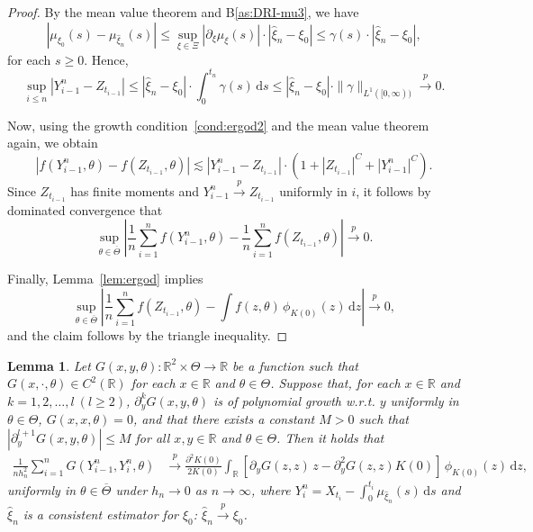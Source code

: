 \documentclass[a4paper,10pt,twoside]{article}
\newtheorem{lem}{Lemma}[section]
\numberwithin{equation}{section}
\def\R{\mathbb{R}}
\def\l{\left}
\def\r{\right}
\def\g{\gamma}
\def\th{\theta}
\def\p{\partial}
\def\toP{\stackrel{p}{\longrightarrow}}
\def\wh#1{\widehat{#1}}
\def\ol#1{\overline{#1}}
\def\df{\mathrm{d}}
\begin{document}
\begin{proof}
By the mean value theorem and B\ref{as:DRI-mu3}, we have
\[
\l| \mu_{\xi_0}(s) - \mu_{\widehat{\xi}_n}(s) \r|
\le \sup_{\xi \in \Xi} |\partial_\xi \mu_\xi(s)| \cdot |\widehat{\xi}_n - \xi_0|
\le \g(s) \cdot |\widehat{\xi}_n - \xi_0|,
\]
for each $s \ge 0$. Hence,
\[
\sup_{i \le n} |Y_{i-1}^n - Z_{t_{i-1}}|
\le |\widehat{\xi}_n - \xi_0| \cdot \int_0^{t_n} \g(s)\,\df s
\le |\widehat{\xi}_n - \xi_0| \cdot \|\g\|_{L^1([0,\infty))} \toP 0.
\]

Now, using the growth condition~\eqref{cond:ergod2} and the mean value theorem again, we obtain
\[
|f(Y_{i-1}^n,\theta) - f(Z_{t_{i-1}},\theta)|
\lesssim |Y_{i-1}^n - Z_{t_{i-1}}| \cdot \l(1 + |Z_{t_{i-1}}|^C + |Y_{i-1}^n|^C\r).
\]
Since $Z_{t_{i-1}}$ has finite moments and $Y_{i-1}^n \toP Z_{t_{i-1}}$ uniformly in $i$, it follows by dominated convergence that
\[
\sup_{\theta \in \overline{\Theta}} \l| \frac{1}{n} \sum_{i=1}^n f(Y_{i-1}^n,\theta) - \frac{1}{n} \sum_{i=1}^n f(Z_{t_{i-1}},\theta) \r| \toP 0.
\]

Finally, Lemma~\ref{lem:ergod} implies
\[
\sup_{\theta \in \overline{\Theta}} \l| \frac{1}{n} \sum_{i=1}^n f(Z_{t_{i-1}},\theta) - \int f(z,\theta)\,\phi_{K(0)}(z)\,\df z \r| \toP 0,
\]
and the claim follows by the triangle inequality.
\end{proof}


\begin{lem}\label{lem:GY}
Let $G(x,y,\th) :\R^2\times \Theta\to \R$ be a function such that $G(x,\cdot,\th)\in C^2(\R)$ for each $x\in \R$ and $\th\in \Theta$.
Suppose that, for each $x\in \R$ and $k=1,2,\dots, l \ (l\ge 2)$, $\p_y^kG(x,y,\th)$ is of polynomial growth w.r.t. $y$ uniformly in $\th\in \Theta$, $G(x,x,\th) = 0$, and that  there exists a constant $M>0$ such that $|\p_y^{l+1}G(x,y,\th)| \le M$ for all $x,y\in \R$ and $\th \in \Theta$. Then it holds that 
\begin{align*}
\frac{1}{nh_n^2}\sum_{i=1}^n G(Y^n_{i-1}, Y_i^n,\th)
&\toP  \frac{\p^2 K(0)}{2 K(0)}  \int_\R \l[\p_y G(z,z)\,z - \p_y^2 G(z, z)K(0)\r] \, \phi_{K(0)}(z)\,\df z,
\end{align*}
uniformly in $\th \in \ol{\Theta}$ under $h_n\to 0$ as $n\to \infty$, where $Y_i^n= X_{t_i} - \int_0^{t_i} \mu_{\wh{\xi}_n}(s)\,\df s$ and 
$\wh{\xi}_n$ is a consistent estimator for $\xi_0$: $\wh{\xi}_n\toP \xi_0$. 
\end{lem}
  
\end{document}
